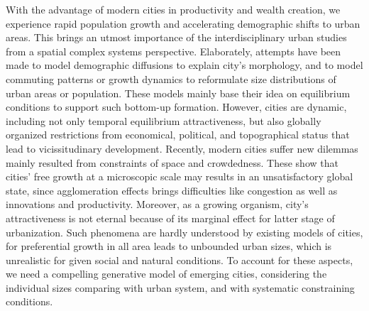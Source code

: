 \documentclass[reprint,unsortedaddress,amsmath,amssymb,aps,prl,showkeys]{revtex4-2}
\begin{document}
With the advantage of modern cities in productivity and wealth creation\cite{Glaeser592,bettencourt2010unified}, we experience rapid population growth and accelerating demographic shifts to urban areas. This brings an utmost importance of the interdisciplinary urban studies from a spatial complex systems perspective\cite{batty2013new,batty2007cities,batty2008size,portugali2011complexity,angel2005dynamics,boeing2017structure,PhysRevLett.79.523,bettencourt2013origins}. Elaborately, attempts have been made to model demographic diffusions to explain city's morphology, and to model commuting patterns or growth dynamics to reformulate size distributions of urban areas or population. These models mainly base their idea on equilibrium conditions to support such bottom-up formation. However, cities are dynamic, including not only temporal equilibrium attractiveness, but also globally organized restrictions from economical, political, and topographical status that lead to vicissitudinary development. Recently, modern cities suffer new dilemmas mainly resulted from constraints of space and crowdedness\cite{haase2014conceptualizing,martinez2012shrinking, PhysRevLett.120.108701,manoli2019magnitude}. These show that cities' free growth at a microscopic scale may results in an unsatisfactory global state, since agglomeration effects\cite{batty2013new} brings difficulties like congestion as well as innovations and productivity. Moreover, as a growing organism, city's attractiveness is not eternal because of its marginal effect for latter stage of urbanization\cite{atkinson2012urban,girardin2009quantifying}. Such phenomena are hardly understood by existing models of cities, for preferential growth in all area leads to unbounded urban sizes, which is unrealistic for given social and natural conditions. To account for these aspects, we need a compelling generative model of emerging cities, considering the individual sizes comparing with urban system, and with systematic constraining conditions. 

\end{document}
